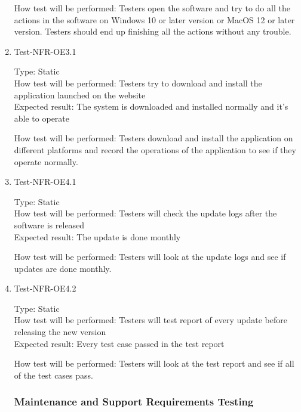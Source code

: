\documentclass[12pt, titlepage]{article}
\begin{document}
\begin{enumerate}
How test will be performed: Testers open the software and try to do all the actions in the software on Windows 10 or later version or MacOS 12 or later version. Testers should end up finishing all the actions without any trouble.

\item{Test-NFR-OE3.1\\}

Type: Static\\

How test will be performed: Testers try to download and install the application launched on the website\\

Expected result: The system is downloaded and installed normally and it's able to operate

How test will be performed: Testers download and install the application on different platforms and record the operations of the application to see if they operate normally.

\item{Test-NFR-OE4.1\\}

Type: Static\\

How test will be performed: Testers will check the update logs after the software is released\\

Expected result: The update is done monthly

How test will be performed: Testers will look at the update logs and see if updates are done monthly.

\item{Test-NFR-OE4.2\\}

Type: Static\\

How test will be performed: Testers will test report of every update before releasing the new version\\

Expected result: Every test case passed in the test report

How test will be performed: Testers will look at the test report and see if all of the test cases pass.


\subsubsection{Maintenance and Support Requirements Testing}


\end{enumerate}
\end{document}
